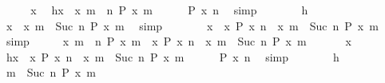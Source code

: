 \begin{isabellebody}
%
\isadelimproof
%
\endisadelimproof
%
\isatagproof
{}\isamarkupfalse%
\isanewline
\ \ \isacommand{{\isacharbraceleft}}\isamarkupfalse%
\ \isamarkupfalse%
\ x\ \isamarkupfalse%
\ h{\isacharcolon}{\isacartoucheopen}x\ {\isasymin}\ {\isacharbraceleft}x{\isachardot}\ {\isasymforall}m\ {\isasymge}\ n{\isachardot}\ P\ x\ m{\isacharbraceright}{\isacartoucheclose}\isanewline
\ \ \ \ \isamarkupfalse%
\ {\isacartoucheopen}P\ x\ n{\isacartoucheclose}\ \isamarkupfalse%
\ simp\isanewline
\ \ \ \ \isamarkupfalse%
\ \isamarkupfalse%
\ h\ \isamarkupfalse%
\ {\isacartoucheopen}x\ {\isasymin}\ {\isacharbraceleft}x{\isachardot}\ {\isasymforall}m\ {\isasymge}\ Suc\ n{\isachardot}\ P\ x\ m{\isacharbraceright}{\isacartoucheclose}\ \isamarkupfalse%
\ simp\isanewline
\ \ \ \ \isamarkupfalse%
\ \isamarkupfalse%
\ {\isacartoucheopen}x\ {\isasymin}\ {\isacharbraceleft}x{\isachardot}\ P\ x\ n{\isacharbraceright}\ {\isasyminter}\ {\isacharbraceleft}x{\isachardot}\ {\isasymforall}m\ {\isasymge}\ Suc\ n{\isachardot}\ P\ x\ m{\isacharbraceright}{\isacartoucheclose}\ \isamarkupfalse%
\ simp\isanewline
\ \ \isacommand{{\isacharbraceright}}\isamarkupfalse%
\ \isamarkupfalse%
\ {\isacartoucheopen}{\isacharbraceleft}x{\isachardot}\ {\isasymforall}m\ {\isasymge}\ n{\isachardot}\ P\ x\ m{\isacharbraceright}\ {\isasymsubseteq}\ {\isacharbraceleft}x{\isachardot}\ P\ x\ n{\isacharbraceright}\ {\isasyminter}\ {\isacharbraceleft}x{\isachardot}\ {\isasymforall}m\ {\isasymge}\ Suc\ n{\isachardot}\ P\ x\ m{\isacharbraceright}{\isacartoucheclose}\ \isacommand{{\isachardot}{\isachardot}}\isamarkupfalse%
\isanewline
{}\isamarkupfalse%
\isanewline
\ \ \isacommand{{\isacharbraceleft}}\isamarkupfalse%
\ \isamarkupfalse%
\ x\ \ \isamarkupfalse%
\ h{\isacharcolon}{\isacartoucheopen}x\ {\isasymin}\ {\isacharbraceleft}x{\isachardot}\ P\ x\ n{\isacharbraceright}\ {\isasyminter}\ {\isacharbraceleft}x{\isachardot}\ {\isasymforall}m\ {\isasymge}\ Suc\ n{\isachardot}\ P\ x\ m{\isacharbraceright}{\isacartoucheclose}\isanewline
\ \ \ \ \isamarkupfalse%
\ {\isacartoucheopen}P\ x\ n{\isacartoucheclose}\ \isamarkupfalse%
\ simp\isanewline
\ \ \ \ \isamarkupfalse%
\ \isamarkupfalse%
\ h\ \isamarkupfalse%
\ {\isacartoucheopen}{\isasymforall}m\ {\isasymge}\ Suc\ n{\isachardot}\ P\ x\ m{\isacartoucheclose}\ \isamarkupfalse%

\end{isabellebody}

